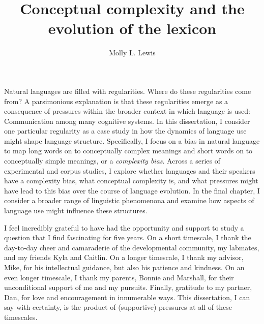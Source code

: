 \documentclass[12pt]{report}
\begin{document}
\title{Conceptual complexity and the evolution of the lexicon}
\author{Molly L. Lewis}
 
\beforepreface 
{}
Natural languages are filled with regularities. Where do these regularities come from? A parsimonious explanation is that these regularities emerge as a consequence of pressures within the broader context in which language is used: Communication among many cognitive systems. In this dissertation, I consider one particular regularity as a case study in how the dynamics of language use might shape language structure. Specifically, I focus on a bias in natural language to map long words on to conceptually complex meanings and short words on to conceptually simple meanings, or a {\it complexity bias}. Across a series of experimental and corpus studies, I explore whether languages and their speakers have a complexity bias, what conceptual complexity is, and what pressures might have lead to this bias over the course of language evolution. In the final chapter, I consider a broader range of linguistic phenomenona and examine how aspects of language use might influence these structures. 

I feel incredibly grateful to have had the opportunity and support to study a question that I find fascinating for five years. On a short timescale, I thank the day-to-day cheer and camaraderie of the developmental community, my labmates, and my friends Kyla and Caitlin. On a longer timescale, I thank my advisor, Mike, for his intellectual guidance, but also his patience and kindness. On an even longer timescale, I thank my parents, Bonnie and Marshall, for their unconditional support of me and my pursuits. Finally, gratitude to my partner, Dan, for love and encouragement in innumerable ways. This dissertation, I can say with certainty, is the product of (supportive) pressures at all of these timescales.  


\afterpreface










\end{document}
